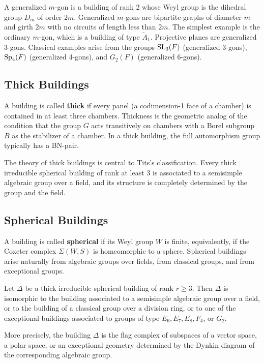 \begin{example}
A generalized \(m\)-gon is a building of rank 2 whose Weyl group is the dihedral group \(D_m\) of order \(2m\). Generalized \(m\)-gons are bipartite graphs of diameter \(m\) and girth \(2m\) with no circuits of length less than \(2m\). The simplest example is the ordinary \(m\)-gon, which is a building of type \(\tilde{A}_1\). Projective planes are generalized 3-gons. Classical examples arise from the groups \(\operatorname{SL}_3(F)\) (generalized 3-gons), \(\operatorname{Sp}_4(F)\) (generalized 4-gons), and \(G_2(F)\) (generalized 6-gons).
\end{example}

\subsection{Thick Buildings}

A building is called \textbf{thick} if every panel (a codimension-1 face of a chamber) is contained in at least three chambers. Thickness is the geometric analog of the condition that the group \(G\) acts transitively on chambers with a Borel subgroup \(B\) as the stabilizer of a chamber. In a thick building, the full automorphism group typically has a BN-pair.

The theory of thick buildings is central to Tits's classification. Every thick irreducible spherical building of rank at least 3 is associated to a semisimple algebraic group over a field, and its structure is completely determined by the group and the field.

\subsection{Spherical Buildings}

A building is called \textbf{spherical} if its Weyl group \(W\) is finite, equivalently, if the Coxeter complex \(\Sigma(W, S)\) is homeomorphic to a sphere. Spherical buildings arise naturally from algebraic groups over fields, from classical groups, and from exceptional groups.

\begin{theorem}
Let \(\Delta\) be a thick irreducible spherical building of rank \(r \geq 3\). Then \(\Delta\) is isomorphic to the building associated to a semisimple algebraic group over a field, or to the building of a classical group over a division ring, or to one of the exceptional buildings associated to groups of type \(E_6, E_7, E_8, F_4\), or \(G_2\).

More precisely, the building \(\Delta\) is the flag complex of subspaces of a vector space, a polar space, or an exceptional geometry determined by the Dynkin diagram of the corresponding algebraic group.
\end{theorem}

